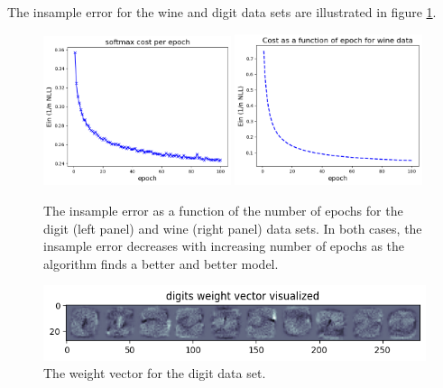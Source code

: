 \documentclass{article}
\begin{document}
The insample error for the wine and digit data sets are illustrated in figure \ref{fig:softmax}.
\begin{figure}
	\centering
	\includegraphics[width=0.49\textwidth]{softmax_cost_per_epoch}
	\includegraphics[width=0.49\textwidth]{softmax_wine_cost_per_epoch}
	\caption{The insample error as a function of the number of epochs for the digit (left panel) and wine (right panel) data sets. In both cases, the insample error decreases with increasing number of epochs as the algorithm finds a better and better model.}
	\label{fig:softmax}
\end{figure}

\begin{figure}
	\centering
	\includegraphics{softmax_weight_vector}
	\caption{The weight vector for the digit data set.}
\end{figure}
\end{document}
